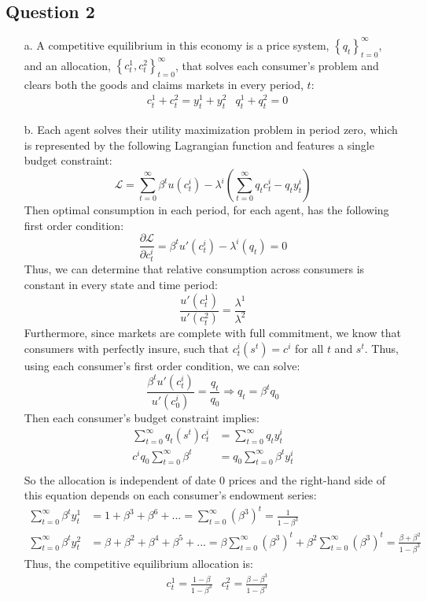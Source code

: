 \documentclass{article}
\renewcommand{\L}{\mathcal{L}}
\begin{document}

\subsection*{Question 2}
\begin{itemize}
	\item[a.] A competitive equilibrium in this economy is a price system, ${\left\{q_t\right\}_{t=0}^\infty}$, and an allocation, ${\left\{c^1_t, c^2_t\right\}_{t=0}^\infty}$, that solves each consumer's problem and clears both the goods and claims markets in every period, $t$:
		\begin{align*} &c_t^1 + c_t^2 = y_t^1 + y_t^2	&q_t^1 + q_t^2 = 0  \end{align*}
	
	\item[b.] Each agent solves their utility maximization problem in period zero, which is represented by the following Lagrangian function and features a single budget constraint:
		\[
			\L = \sum_{t=0}^\infty \beta^tu(c_t^i) - \lambda^i\left(\sum_{t=0}^\infty q_tc_t^i - q_ty^i_t\right)
		\]
		Then optimal consumption in each period, for each agent, has the following first order condition:
		\[
			\frac{\partial\L}{\partial c^i_t} = \beta^tu'(c_t^i) - \lambda^i\left(q_t\right) = 0
		\]
		Thus, we can determine that relative consumption across consumers is constant in every state and time period:
		\[
			\frac{u'(c_t^1)}{u'(c_t^2)} = \frac{\lambda^1}{\lambda^2}
		\]
		Furthermore, since markets are complete with full commitment, we know that consumers with perfectly insure, such that ${c^i_t(s^t)=c^i}$ for all $t$ and $s^t$. Thus, using each consumer's first order condition, we can solve:
		\[
			\frac{\beta^tu'(c_t^i)}{u'(c_0^i)} = \frac{q_t}{q_0}\Rightarrow q_t = \beta^tq_0
		\]
		Then each consumer's budget constraint implies:
		\begin{align*}
			\sum_{t=0}^\infty q_t(s^t)c_t^i 	&= \sum_{t=0}^\infty q_ty^i_t		\\
			c^iq_0\sum_{t=0}^\infty \beta^t 	&= q_0\sum_{t=0}^\infty\beta^ty^i_t	\\
		\end{align*}
		So the allocation is independent of date 0 prices and the right-hand side of this equation depends on each consumer's endowment series:
		\begin{align*}
			\sum_{t=0}^\infty\beta^ty^1_t	&= 1 + \beta^3 + \beta^6 + ... = \sum_{t=0}^\infty(\beta^3)^t = \frac{1}{1-\beta^3}										\\
			\sum_{t=0}^\infty\beta^ty^2_t	&= \beta + \beta^2 + \beta^4 + \beta^5 + ... = \beta\sum_{t=0}^\infty(\beta^3)^t + \beta^2\sum_{t=0}^\infty(\beta^3)^t	
											= \frac{\beta + \beta^2}{1-\beta^3}
		\end{align*}
		Thus, the competitive equilibrium allocation is:
		\begin{align*} &c_t^1 = \frac{1-\beta}{1-\beta^3}	&c_t^2 = \frac{\beta-\beta^3}{1-\beta^3}  \end{align*}
	

\end{itemize}
\end{document}

